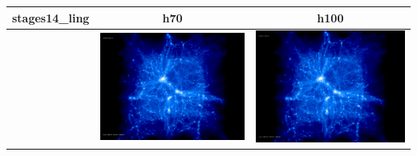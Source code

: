 \documentclass[a4paper,11pt,fleqn,oneside]{book}
\begin{document}
\begin{itemize}
\begin{table}[p]
\begin{tabular}{l|c|c}
\end{tabular}
\end{table}
\begin{table}[p]
\centering
\begin{tabular}{l|c|c}
stages14\_ling & h70 & h100 \\
\hline 
 & \includegraphics[scale=0.075]{r256/h100/stages14_ling/197.jpg} & \includegraphics[scale=0.075]{r256/h100/stages14_ling/197.jpg} \\

\end{tabular}
\end{table}
\end{itemize}
\end{document}
